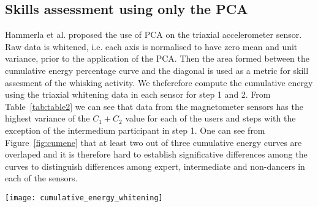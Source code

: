 \documentclass{sigchi}
\begin{document}
\subsection{Skills assessment using only the PCA}
Hammerla et al. \cite{Hammerla2011} proposed the use of PCA on the triaxial accelerometer sensor. 
Raw data is whitened, i.e. each axis is normalised to have zero mean and unit variance, prior to the application of the PCA.
Then the area formed between the cumulative energy percentage curve and the diagonal is used as a metric for skill assesment 
of the whisking activity. %
We theferefore compute the cumulative energy using the triaxial whitening data in each sensor for step 1 and 2.
From Table~\ref{tab:table2} we can see that data from the magnetometer sensors has the highest variance 
of the $C_1 + C_2$ value for each of the users and steps with the exception of the intermedium participant in step 1. 
One can see from Figure~\ref{fig:cumene} that at least two out of three cumulative energy curves are overlaped 
and it is therefore hard to establish significative differences among the curves to distinguish differences among expert, intermediate and 
non-dancers in each of the sensors.
\begin{figure*}[!t]
\centering    
\texttt{[image: cumulative\_energy\_whitening]}
\caption[PA]{Cumulative energy percentage curves for expert, intermediate and non-dancer users performing step 1 and step 2
using triaxial accelerometer (ACC), gyroscope (GYR), and magnetometer (MAG) sensors.}
\label{fig:cumene}
\end{figure*}
% 
% 
% 
\end{document}
